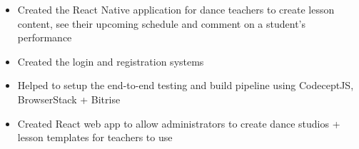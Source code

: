 \bigbreak
\begin{itemize}
    \item Created the React Native application for dance teachers to create lesson content, see their upcoming schedule and comment on a student's performance
    \item Created the login and registration systems
    \item Helped to setup the end-to-end testing and build pipeline using CodeceptJS, BrowserStack + Bitrise
    \item Created React web app to allow administrators to create dance studios + lesson templates for teachers to use
\end{itemize}
